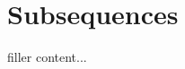 \documentclass[../../templates/section]{subfiles}
\begin{document}
\section{Subsequences}\label{sec:subsequences}

filler content...
\end{document}
